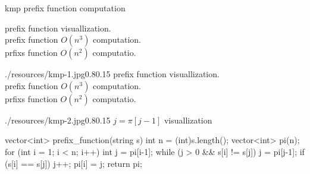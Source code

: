 \begin{problem}{kmp prefix function computation}
\end{problem}



\begin{solution}[BruteForce | $O(n^3), O(n^2)$]

    prefix function visuallization.\\
    prefix function $O(n^3)$ computation.\\
    prfixs function $O(n^2)$ computatio.

    \begin{lfigure}{./resources/kmp-1.jpg}{0.80}{.15}
        prefix function visuallization.\\
        prefix function $O(n^3)$ computation.\\
        prfixs function $O(n^2)$ computatio.

    \end{lfigure}
\end{solution}

\begin{solution}


    \begin{lfigure}{./resources/kmp-2.jpg}{0.80}{.15}
       $j = \pi[j-1]$ visuallization
    \end{lfigure}


\begin{code3}
vector<int> prefix_function(string s) {
    int n = (int)s.length();
    vector<int> pi(n);
    for (int i = 1; i < n; i++) {
        int j = pi[i-1];
        while (j > 0 && s[i] != s[j])
            j = pi[j-1];
        if (s[i] == s[j])
            j++;
        pi[i] = j;
    }
    return pi;
}
    \end{code3}
\end{solution}